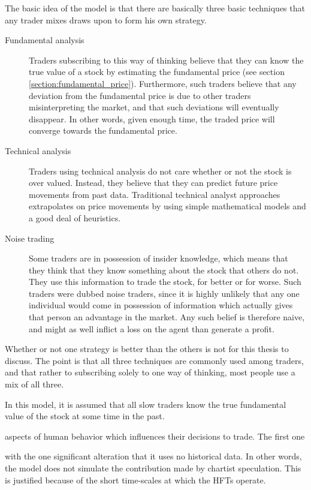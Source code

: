 The basic idea of the model is that there are basically three basic techniques that any trader mixes draws upon to form his own strategy. 
\begin{description}
\item[Fundamental analysis] Traders subscribing to this way of thinking believe that they can know the true value of a stock by estimating the fundamental price (see section \ref{section:fundamental_price}). Furthermore, such traders believe that any deviation from the fundamental price is due to other traders misinterpreting the market, and that such deviations will eventually disappear. In other words, given enough time, the traded price will converge towards the fundamental price. 
\item[Technical analysis] Traders using technical analysis do not care whether or not the stock is over valued. Instead, they believe that they can predict future price movements from past data. Traditional technical analyst approaches extrapolates on price movements by using simple mathematical models and a good deal of heuristics.
\item[Noise trading] Some traders are in possession of insider knowledge, which means that they think that they know something about the stock that others do not. They use this information to trade the stock, for better or for worse. Such traders were dubbed noise traders, since it is highly unlikely that any one individual would come in possession of information which actually gives that person an advantage in the market. Any such belief is therefore naive, and might as well inflict a loss on the agent than generate a profit.
\end{description}

Whether or not one strategy is better than the others is not for this thesis to discuss. The point is that all three techniques are commonly used among traders, and that rather to subscribing solely to one way of thinking, most people use a mix of all three. 




In this model, it is assumed that all slow traders know the true fundamental value of the stock at some time in the past.

aspects of human behavior which influences their decisions to trade. The first one 

 with the one significant alteration that it uses no historical data. In other words, the model does not simulate the contribution made by chartist speculation. This is justified because of the short time-scales at which the HFTs operate. 
 

